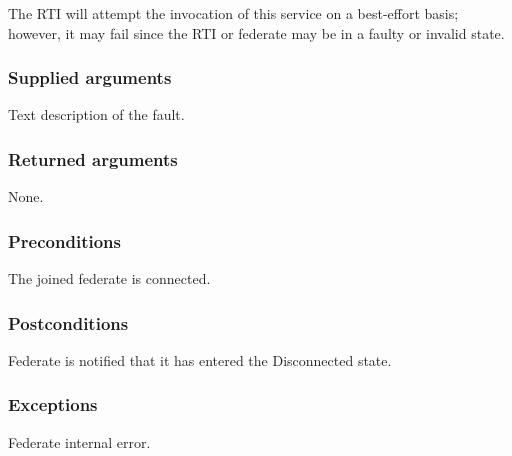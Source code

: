 \clearpage

The RTI will attempt the invocation of this service on a best-effort basis; however, it may fail since the RTI or federate may be in a faulty or invalid state.

\subsubsection{Supplied arguments}

\begin{stdalphalist}
    \item Text description of the fault.
\end{stdalphalist}

\subsubsection{Returned arguments}

\begin{stdalphalist}
    \item None.
\end{stdalphalist}

\subsubsection{Preconditions}

\begin{stdalphalist}
    \item The joined federate is connected.
\end{stdalphalist}

\subsubsection{Postconditions}

\begin{stdalphalist}
    \item Federate is notified that it has entered the Disconnected state.
\end{stdalphalist}

\subsubsection{Exceptions}

\begin{stdalphalist}
    \item Federate internal error.
\end{stdalphalist}

